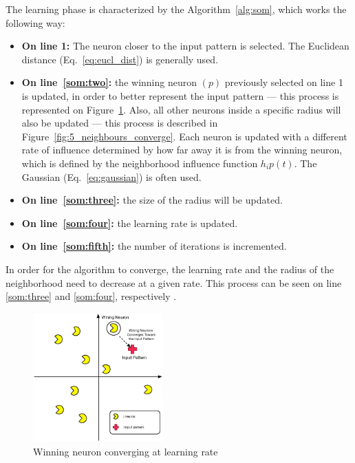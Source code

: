 \documentclass[journal]{IEEEtran}
\begin{document}
The learning phase is characterized by the Algorithm~\ref{alg:som}, which works the following way:
\begin{itemize}
  \item \textbf{On line 1:} The neuron closer to the input pattern is selected. The Euclidean distance (Eq.~\ref{eq:eucl_dist}) is generally used.
    
  \item \textbf{On line~\ref{som:two}:} the winning neuron $(p)$ previously selected on line 1 is updated, in order to better represent the input pattern --- this process is represented on Figure~\ref{fig:4_wining_neuron_converge}. Also, all other neurons inside a specific radius will also be updated --- this process is described in Figure~\ref{fig:5_neighbours_converge}. Each neuron is updated with a different rate of influence determined by how far away it is from the winning neuron, which is defined by the neighborhood influence function $h_ip(t)$. The Gaussian (Eq.~\ref{eq:gaussian}) is often used. 
    
  \item \textbf{On line~\ref{som:three}:} the size of the radius will be updated.
  \item \textbf{On line~\ref{som:four}:} the learning rate is updated.
  \item \textbf{On line~\ref{som:fifth}:} the number of iterations is incremented.
\end{itemize}
 
In order for the algorithm to converge, the learning rate and the radius of the neighborhood need to decrease at a given rate. This process can be seen on line \ref{som:three} and \ref{som:four}, respectively .

\begin{figure}
  \begin{center}
    \includegraphics[width=5cm]{images/4_wining_neuron_converge.eps}
  \end{center}
  \caption{ Winning neuron converging at learning rate }
  \label{fig:4_wining_neuron_converge}
\end{figure}
\end{document}
